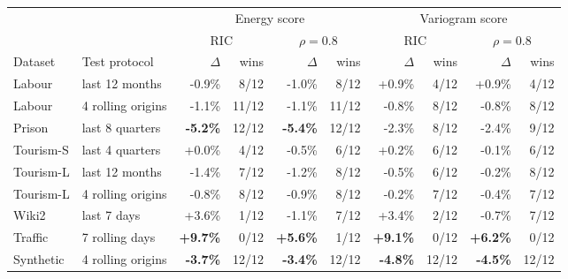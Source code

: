 \begin{tabular}{llrrrrrrrr}
\toprule
 & & \multicolumn{4}{c}{Energy score} & \multicolumn{4}{c}{Variogram score} \\
\cmidrule(lr){3-6} \cmidrule(lr){7-10}
 & & \multicolumn{2}{c}{RIC} & \multicolumn{2}{c}{$\rho{=}0.8$} & \multicolumn{2}{c}{RIC} & \multicolumn{2}{c}{$\rho{=}0.8$} \\
Dataset & Test protocol & $\Delta$ & wins & $\Delta$ & wins & $\Delta$ & wins & $\Delta$ & wins \\
\midrule
Labour & last 12 months & -0.9\% & 8/12 & -1.0\% & 8/12 & +0.9\% & 4/12 & +0.9\% & 4/12 \\
Labour & 4 rolling origins & -1.1\% & 11/12 & -1.1\% & 11/12 & -0.8\% & 8/12 & -0.8\% & 8/12 \\
Prison & last 8 quarters & \textbf{-5.2\%} & 12/12 & \textbf{-5.4\%} & 12/12 & -2.3\% & 8/12 & -2.4\% & 9/12 \\
Tourism-S & last 4 quarters & +0.0\% & 4/12 & -0.5\% & 6/12 & +0.2\% & 6/12 & -0.1\% & 6/12 \\
Tourism-L & last 12 months & -1.4\% & 7/12 & -1.2\% & 8/12 & -0.5\% & 6/12 & -0.2\% & 8/12 \\
Tourism-L & 4 rolling origins & -0.8\% & 8/12 & -0.9\% & 8/12 & -0.2\% & 7/12 & -0.4\% & 7/12 \\
Wiki2 & last 7 days & +3.6\% & 1/12 & -1.1\% & 7/12 & +3.4\% & 2/12 & -0.7\% & 7/12 \\
Traffic & 7 rolling days & \textbf{+9.7\%} & 0/12 & \textbf{+5.6\%} & 1/12 & \textbf{+9.1\%} & 0/12 & \textbf{+6.2\%} & 0/12 \\
Synthetic & 4 rolling origins & \textbf{-3.7\%} & 12/12 & \textbf{-3.4\%} & 12/12 & \textbf{-4.8\%} & 12/12 & \textbf{-4.5\%} & 12/12 \\
\bottomrule
\end{tabular}
